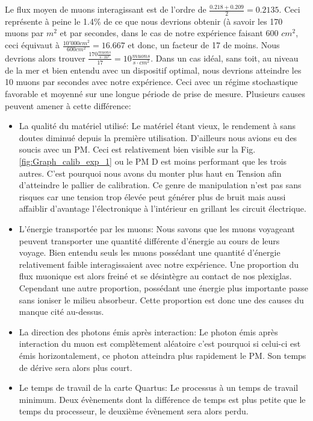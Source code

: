\documentclass[12pt]{article}
\begin{document}
Le flux moyen de muons interagissant est de l'ordre de $\frac{0.218+0.209}{2}=0.2135$. Ceci représente à peine le 1.4\% de ce que nous devrions obtenir (à savoir les 170 muons par $m^2$ et par secondes, dans le cas de notre expérience faisant 600 $cm^{2}$, ceci équivaut à $\frac{10'000cm^{2}}{600cm^{2}}=16.667$ et donc, un facteur de 17 de moins. Nous devrions alors trouver $\frac{170 \frac{muons}{s\cdot m^{2}}}{17}=10 \frac{muons}{s\cdot cm^{2}}$. Dans un cas idéal, sans toit, au niveau de la mer et bien entendu avec un dispositif optimal, nous devrions atteindre les 10 muons par secondes avec notre expérience. Ceci avec un régime stochastique favorable et moyenné sur une longue période de prise de mesure. Plusieurs causes peuvent amener à cette différence: 

\begin{itemize}
    \item La qualité du matériel utilisé: Le matériel étant vieux, le rendement à sans doutes diminué depuis la première utilisation. D'ailleurs nous avions eu des soucis avec un PM. Ceci est relativement bien visible sur la Fig. \ref{fig:Graph_calib_exp_1} ou le PM D est moins performant que les trois autres. C'est pourquoi nous avons du monter plus haut en Tension afin d'atteindre le pallier de calibration. Ce genre de manipulation n'est pas sans risques car une tension trop élevée peut générer plus de bruit mais aussi affaiblir d'avantage l'électronique à l'intérieur en grillant les circuit électrique.
    
    \item L'énergie transportée par les muons: Nous savons que les muons voyageant peuvent transporter une quantité différente d'énergie au cours de leurs voyage. Bien entendu seuls les muons possédant une quantité d'énergie relativement faible interagissaient avec notre expérience. Une proportion du flux muonique est alors freiné et se désintègre au contact de nos plexiglas. Cependant une autre proportion, possédant une énergie plus importante passe sans ioniser le milieu absorbeur. Cette proportion est donc une des causes du manque cité au-dessus.
    
    \item La direction des photons émis après interaction: Le photon émis après interaction du muon est complètement aléatoire c'est pourquoi si celui-ci est émis horizontalement, ce photon atteindra plus rapidement le PM. Son temps de dérive sera alors plus court. 
    
    \item Le temps de travail de la carte Quartus: Le processus à un temps de travail minimum. Deux évènements dont la différence de temps est plus petite que le temps du processeur, le deuxième évènement sera alors perdu.
\end{itemize}
\end{document}
